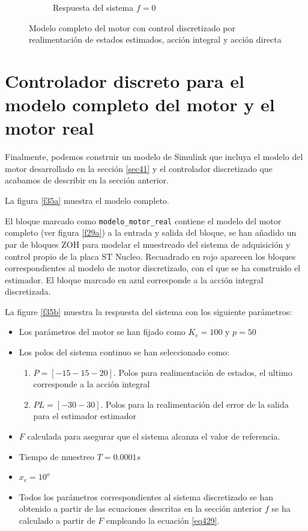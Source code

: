 \documentclass[10pt,a4paper]{report}
\begin{document}
\begin{figure}
\begin{subfigure}{0.6\textwidth}
\caption{Respuesta del sistema $f=0$}
\label{f35c}
\end{subfigure}
\caption{Modelo completo del motor con control discretizado por realimentación de estados estimados, acción integral y acción directa}
\end{figure}
\section{Controlador discreto para el modelo completo del motor y el motor real}

Finalmente, podemos construir un modelo de Simulink que incluya el modelo del motor desarrollado en la sección \ref{sec41} y el controlador discretizado que acabamos de describir en la sección anterior. 

La figura \ref{f35a} muestra el modelo completo. 

El bloque marcado como \texttt{modelo\_motor\_real} contiene el modelo del motor completo (ver figura \ref{f29a}) a la entrada y salida del bloque, se han añadido un par de bloques ZOH para modelar el muestreado del sistema de adquisición y control propio de la placa ST Nucleo. Recuadrado en rojo aparecen los bloques correspondientes al modelo de motor discretizado, con el que se ha construido el estimador. El bloque marcado en azul corresponde a la acción integral discretizada. 

La figure \ref{f35b} muestra la respuesta del sistema con los siguiente parámetros: 
\begin{itemize}
\item Los parámetros del motor se han fijado como $K_e = 100$ y $p =50$
\item Los polos del sistema continuo se han seleccionado como:
\begin{enumerate}
\item $P = [-15 -15 -20]$. Polos para realimentación de estados, el ultimo corresponde a la acción integral
\item $PL = [-30 -30]$.  Polos para la realimentación del error  de la salida para el estimador estimador 
\end{enumerate}
\item $F$ calculada para asegurar que el sistema alcanza el valor de referencia.
\item Tiempo de muestreo $T=0.0001s$
\item $x_r = 10^o$
\item Todos los parámetros correspondientes al sistema discretizado se han obtenido a partir de las ecuaciones descritas en la sección anterior $f$ se ha calculado a partir de $F$ empleando la ecuación \ref{eq429}.
\end{itemize}
\end{document}

